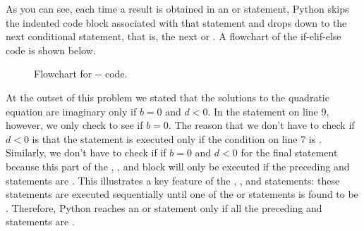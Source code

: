 \documentclass[letterpaper,10pt,english]{sphinxmanual}
\begin{document}
As you can see, each time a  result is obtained in an  or  statement, Python skips the indented code block associated with that  statement and drops down to the next conditional statement, that is, the next  or .  A flowchart of the if-elif-else code is shown below.
\begin{figure}[htbp]
\centering
\capstart

\caption{Flowchart for -- code.}\label{chap6/chap6_loopsconds:fig-flow-if-elif-else}\end{figure}

At the outset of this problem we stated that the solutions to the quadratic equation are imaginary only if \(b=0\) and \(d < 0\).  In the  statement on line 9, however, we only check to see if  \(b=0\).  The reason that we don't have to check if \(d < 0\) is that the  statement is executed only if the condition  on line 7 is .  Similarly, we don't have to check if if \(b=0\) and \(d < 0\) for the final  statement because this part of the , , and  block will only be executed if the preceding  and  statements are .  This illustrates a key feature of the , , and  statements: these statements are executed sequentially until one of the  or  statements is found to be .  Therefore, Python reaches an  or  statement only if all the preceding  and  statements are .
\end{document}
